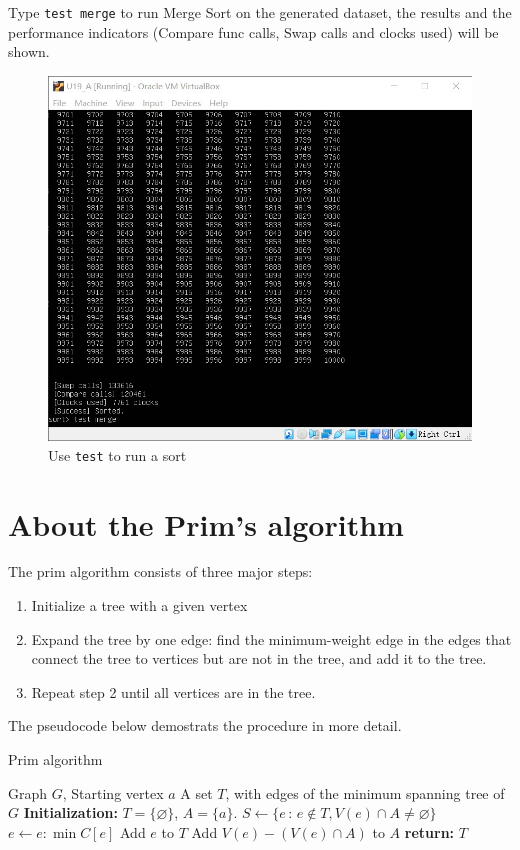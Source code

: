 \documentclass[cn,black,12pt,normal]{elegantnote}
\begin{document}
Type \lstinline{test merge} to run Merge Sort on the generated dataset, the results and the performance indicators (Compare func calls, Swap calls and clocks used) will be shown.

\begin{figure}[H]
    \centering
    \includegraphics[width=0.7\linewidth]{image/sort_04.jpg}
    \caption{Use \lstinline{test} to run a sort}
\end{figure}

\section{About the Prim's algorithm}

The prim algorithm consists of three major steps:
\begin{enumerate}
    \item Initialize a tree with a given vertex
    \item Expand the tree by one edge: find the minimum-weight edge in the edges that connect the tree to vertices but are not in the tree, and add it to the tree.
    \item Repeat step 2 until all vertices are in the tree.
\end{enumerate}

The pseudocode below demostrats the procedure in more detail.
\begin{algorithm}[H]
    \caption{Prim algorithm}
    \label{alg1}
    \begin{algorithmic}
        \REQUIRE Graph $G$, Starting vertex $a$
        \ENSURE A set $T$, with edges of the minimum spanning tree of $G$
        \STATE \textbf{Initialization:} $T=\{ \varnothing  \}$, $A = \{a\}$.
        \STATE $S \gets \{ e\,:\, e \notin T, V(e) \cap A \neq \varnothing \}$
        \STATE $e \gets e:\min{C[e]}$
        \STATE Add $e$ to $T$
        \STATE Add $V(e) - (V(e) \cap A)$ to $A$
        \ENDWHILE
        \STATE \textbf{return:} $T$
    \end{algorithmic}
\end{algorithm}
\end{document}
